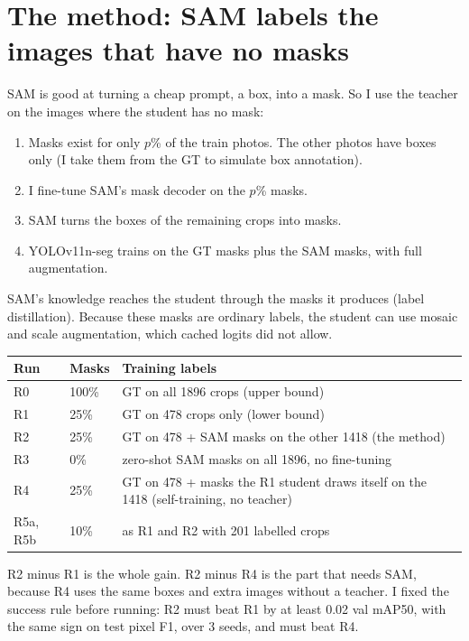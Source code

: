 \documentclass[11pt,a4paper]{article}
\begin{document}
\section{The method: SAM labels the images that have no masks}
SAM is good at turning a cheap prompt, a box, into a mask. So I use the teacher on the images where the student has no mask:
\begin{enumerate}
\item Masks exist for only $p$\% of the train photos. The other photos have boxes only (I take them from the GT to simulate box annotation).
\item I fine-tune SAM's mask decoder on the $p$\% masks.
\item SAM turns the boxes of the remaining crops into masks.
\item YOLOv11n-seg trains on the GT masks plus the SAM masks, with full augmentation.
\end{enumerate}
SAM's knowledge reaches the student through the masks it produces (label distillation). Because these masks are ordinary labels,
the student can use mosaic and scale augmentation, which cached logits did not allow.

\begin{center}\small
\begin{tabular}{llp{9cm}}
\toprule
Run & Masks & Training labels\\
\midrule
R0 & 100\% & GT on all 1896 crops (upper bound)\\
R1 & 25\% & GT on 478 crops only (lower bound)\\
R2 & 25\% & GT on 478 + SAM masks on the other 1418 (the method)\\
R3 & 0\% & zero-shot SAM masks on all 1896, no fine-tuning\\
R4 & 25\% & GT on 478 + masks the R1 student draws itself on the 1418 (self-training, no teacher)\\
R5a, R5b & 10\% & as R1 and R2 with 201 labelled crops\\
\bottomrule
\end{tabular}\end{center}
R2 minus R1 is the whole gain. R2 minus R4 is the part that needs SAM, because R4 uses the same boxes and extra images without a teacher.
I fixed the success rule before running: R2 must beat R1 by at least 0.02 val mAP50, with the same sign on test pixel F1, over 3 seeds,
and must beat R4.
\end{document}
